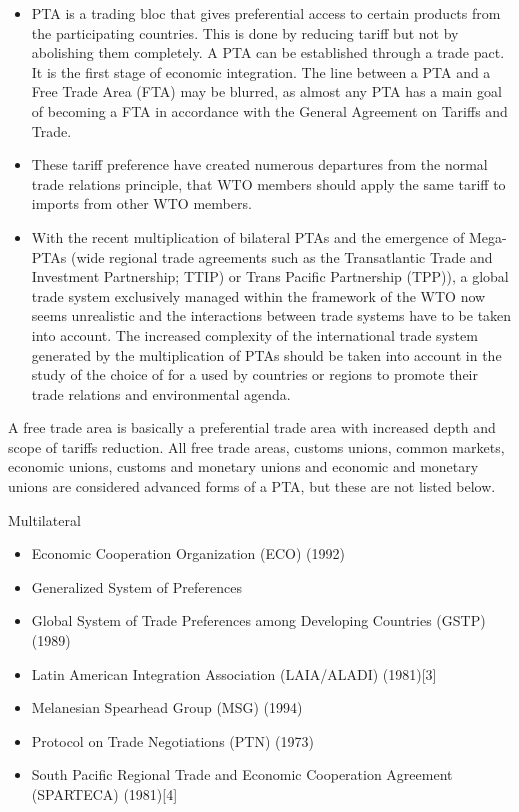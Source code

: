 \documentclass[
  openany]{book}
\providecommand{\tightlist}{%
  \setlength{\itemsep}{0pt}\setlength{\parskip}{0pt}}
\begin{document}
\begin{itemize}
\tightlist
\item
  PTA is a trading bloc that gives preferential access to certain products from the participating countries. This is done by reducing tariff but not by abolishing them completely. A PTA can be established through a trade pact. It is the first stage of economic integration. The line between a PTA and a Free Trade Area (FTA) may be blurred, as almost any PTA has a main goal of becoming a FTA in accordance with the General Agreement on Tariffs and Trade.
\item
  These tariff preference have created numerous departures from the normal trade relations principle, that WTO members should apply the same tariff to imports from other WTO members.
\item
  With the recent multiplication of bilateral PTAs and the emergence of Mega-PTAs (wide regional trade agreements such as the Transatlantic Trade and Investment Partnership; TTIP) or Trans Pacific Partnership (TPP)), a global trade system exclusively managed within the framework of the WTO now seems unrealistic and the interactions between trade systems have to be taken into account. The increased complexity of the international trade system generated by the multiplication of PTAs should be taken into account in the study of the choice of for a used by countries or regions to promote their trade relations and environmental agenda.
\end{itemize}

A free trade area is basically a preferential trade area with increased depth and scope of tariffs reduction. All free trade areas, customs unions, common markets, economic unions, customs and monetary unions and economic and monetary unions are considered advanced forms of a PTA, but these are not listed below.

Multilateral

\begin{itemize}
\tightlist
\item
  Economic Cooperation Organization (ECO) (1992)
\item
  Generalized System of Preferences
\item
  Global System of Trade Preferences among Developing Countries (GSTP) (1989)
\item
  Latin American Integration Association (LAIA/ALADI) (1981){[}3{]}
\item
  Melanesian Spearhead Group (MSG) (1994)
\item
  Protocol on Trade Negotiations (PTN) (1973)
\item
  South Pacific Regional Trade and Economic Cooperation Agreement (SPARTECA) (1981){[}4{]}
\end{itemize}
\end{document}
